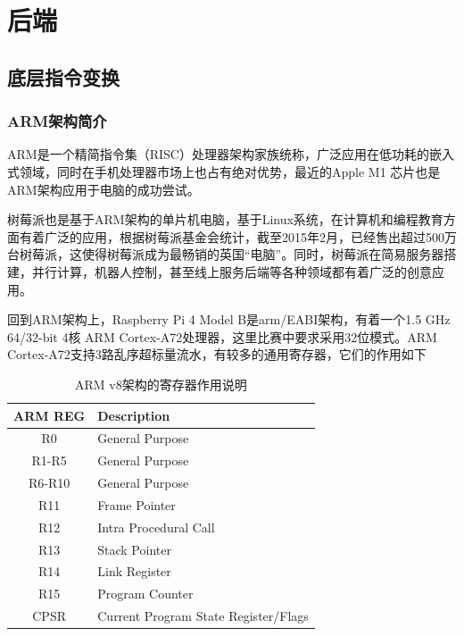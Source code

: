 
\chapter{后端}

\section{底层指令变换}

\subsection{ARM架构简介}

ARM是一个精简指令集（RISC）处理器架构家族统称，广泛应用在低功耗的嵌入式领域，同时在手机处理器市场上也占有绝对优势，最近的Apple M1 芯片也是ARM架构应用于电脑的成功尝试。

树莓派也是基于ARM架构的单片机电脑，基于Linux系统，在计算机和编程教育方面有着广泛的应用，根据树莓派基金会统计，截至2015年2月，已经售出超过500万台树莓派，这使得树莓派成为最畅销的英国“电脑”。同时，树莓派在简易服务器搭建，并行计算，机器人控制，甚至线上服务后端等各种领域都有着广泛的创意应用。

回到ARM架构上，Raspberry Pi 4 Model B是arm/EABI架构，有着一个1.5 GHz 64/32-bit 4核 ARM Cortex-A72处理器，这里比赛中要求采用32位模式。ARM Cortex-A72支持3路乱序超标量流水，有较多的通用寄存器，它们的作用如下


\begin{table}[htb]
  \centering\small
  \caption{ARM v8架构的寄存器作用说明}
  \label{tab:arm}
  \begin{tabular}{cl}
    \toprule
    ARM REG	 & Description	\\
    \midrule
    R0	& General Purpose	\\
    R1-R5 &	General Purpose \\
    R6-R10 &	General Purpose \\
    R11  &Frame Pointer \\
    R12	& Intra Procedural Call \\
    R13  &	Stack Pointer	\\
    R14  &	Link Register	\\
    R15  &	 Program Counter \\
    CPSR &	Current Program State Register/Flags    \\
    \bottomrule
  \end{tabular}
\end{table}


